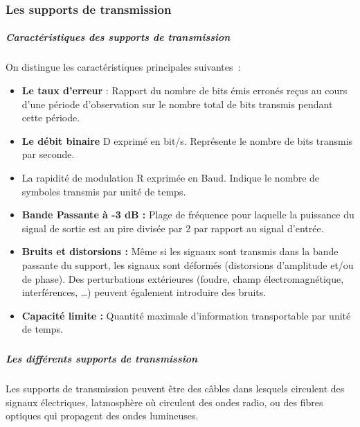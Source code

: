 \hypertarget{les-supports-de-transmission}{%
\subsubsection{Les supports de transmission}\label{les-supports-de-transmission}}

\hypertarget{caractuxe9ristiques-des-supports-de-transmission}{%
\subparagraph*{Caractéristiques des supports de transmission}\label{caractuxe9ristiques-des-supports-de-transmission}}

On distingue les caractéristiques principales suivantes~:

\begin{itemize}
\item
  \textbf{Le taux d'erreur} : Rapport du nombre de bits émis erronés reçus au cours d'une période d'observation sur le nombre total de bits transmis pendant cette période.
\item
  \textbf{Le débit binaire} D exprimé en bit/s. Représente le nombre de bits transmis par seconde.
\item
  La rapidité de modulation R exprimée en Baud. Indique le nombre de symboles transmis par unité de temps.
\item
  \textbf{Bande Passante à -3 dB :} Plage de fréquence pour laquelle la puissance du signal de sortie est au pire divisée par 2 par rapport au signal d'entrée.
\item
  \textbf{Bruits et distorsions :} Même si les signaux sont transmis dans la bande passante du support, les signaux sont déformés (distorsions d'amplitude et/ou de phase). Des perturbations extérieures (foudre, champ électromagnétique, interférences, \ldots) peuvent également introduire des bruits.
\item
  \textbf{Capacité limite :} Quantité maximale d'information transportable par unité de temps.
\end{itemize}

\hypertarget{section-1}{%
\subparagraph*{}\label{section-1}}

\hypertarget{les-diffuxe9rents-supports-de-transmission}{%
\subparagraph*{Les différents supports de transmission}\label{les-diffuxe9rents-supports-de-transmission}}

Les supports de transmission peuvent être des câbles dans lesquels circulent des signaux électriques, l\textquotesingle atmosphère où circulent des ondes radio, ou des fibres optiques qui propagent des ondes lumineuses.

